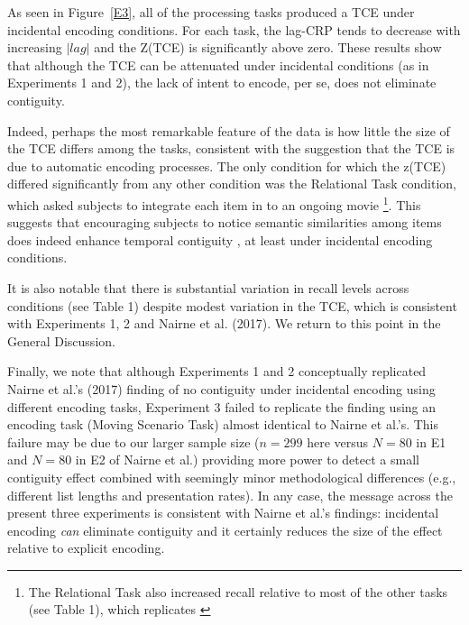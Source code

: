 \documentclass[man,natbib,floatsintext]{apa6} %
\begin{document}
As seen in Figure~\ref{E3}, all of the processing tasks produced a TCE under incidental encoding conditions. For each task, the lag-CRP tends to decrease with increasing $|lag|$ and the Z(TCE) is significantly above zero. These results show that although the TCE can be attenuated under incidental conditions (as in Experiments 1 and 2), the lack of intent to encode, per se, does not eliminate contiguity. 

Indeed, perhaps the most remarkable feature of the data is how little the size of the TCE differs among the tasks, consistent with the suggestion that the TCE is due to automatic encoding processes. The only condition for which the z(TCE) differed significantly from any other condition was the Relational Task condition, which asked subjects to integrate each item in to an ongoing movie \footnote{The Relational Task also increased recall relative to most of the other tasks (see Table 1), which replicates \citet{BowClar69}}. This suggests that encouraging subjects to notice semantic similarities among items does indeed enhance temporal contiguity \citep{Hint16}, at least under incidental encoding conditions. 

It is also notable that there is substantial variation in recall levels across conditions (see Table 1) despite modest variation in the TCE, which is consistent with Experiments 1, 2 and Nairne et al. (2017). We return to this point in the General Discussion.

Finally, we note that although Experiments 1 and 2 conceptually replicated Nairne et al.'s (2017) finding of no contiguity under incidental encoding using different encoding tasks, Experiment 3 failed to replicate the finding using an encoding task (Moving Scenario Task) almost identical to Nairne et al.'s. This failure may be due to our larger sample size ($n=299$ here versus $N=80$ in E1 and $N=80$ in E2 of Nairne et al.) providing more power to detect a small contiguity effect combined with seemingly minor methodological differences (e.g., different list lengths and presentation rates). In any case, the message across the present three experiments is consistent with Nairne et al.'s findings: incidental encoding \emph{can} eliminate contiguity and it certainly reduces the size of the effect relative to explicit encoding. 
\end{document}
